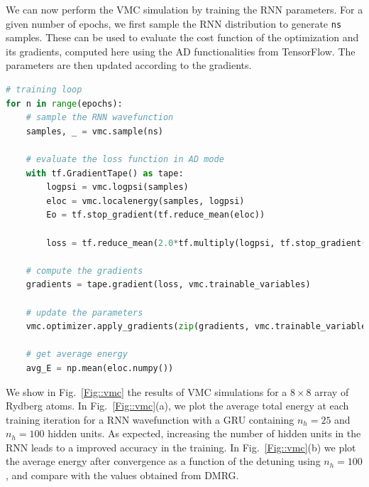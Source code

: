 \documentclass[twocolumn,english,reprint,superscriptaddress,longbibliography,pra]{revtex4-1}
\begin{document}
We can now perform the VMC simulation by training the RNN parameters. For a given number of epochs, we first sample the RNN distribution to generate \texttt{ns} samples. These can be used to evaluate the cost function of the optimization and its gradients, computed here using the AD functionalities from TensorFlow. The parameters are then updated according to the gradients.
\begin{lstlisting}[language=Python,numbers=none]
# training loop
for n in range(epochs):
    # sample the RNN wavefunction
    samples, _ = vmc.sample(ns)
    
    # evaluate the loss function in AD mode
    with tf.GradientTape() as tape:
        logpsi = vmc.logpsi(samples)
        eloc = vmc.localenergy(samples, logpsi)
        Eo = tf.stop_gradient(tf.reduce_mean(eloc))

        loss = tf.reduce_mean(2.0*tf.multiply(logpsi, tf.stop_gradient(eloc)) - 2.0*Eo*logpsi)
    
    # compute the gradients
    gradients = tape.gradient(loss, vmc.trainable_variables)
    
    # update the parameters
    vmc.optimizer.apply_gradients(zip(gradients, vmc.trainable_variables))
    
    # get average energy	
    avg_E = np.mean(eloc.numpy())
\end{lstlisting}

We show in Fig.~\ref{Fig::vmc} the results of VMC simulations for a $8\times8$ array of Rydberg atoms. In Fig.~\ref{Fig::vmc}(a), we plot the average total energy at each training iteration for a RNN wavefunction with a GRU containing $n_h=25$ and $n_h=100$ hidden units. As expected, increasing the number of hidden units in the RNN leads to a improved accuracy in the training. In Fig.~\ref{Fig::vmc}(b) we plot the average energy after convergence as a function of the detuning using $n_h=100$, and compare with the values obtained from DMRG.
\end{document}
